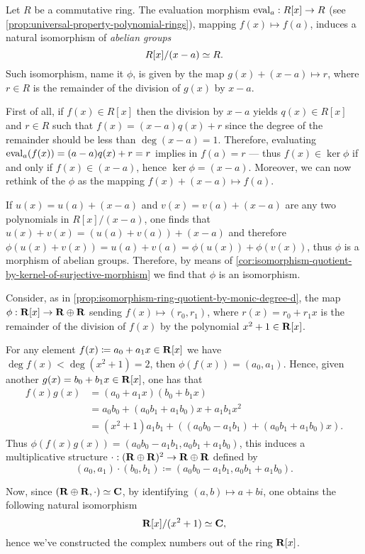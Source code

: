 \begin{example}[Evaluation]
\label{exp:evaluation-induces-isomorphism}
Let \(R\) be a commutative ring. The evaluation morphism \(\operatorname{eval}_a: R[x] \to R\)
(see \cref{prop:universal-property-polynomial-rings}), mapping
\(f(x) \mapsto f(a)\), induces a natural isomorphism of \emph{abelian groups}
\[
R[x]/(x - a) \simeq R.
\]
Such isomorphism, name it \(\phi\), is given by the map
\(g(x) + (x - a) \mapsto r\), where \(r \in R\) is the remainder of the division
of \(g(x)\) by \(x - a\).

First of all, if \(f(x) \in R[x]\) then the division by \(x - a\) yields
\(q(x) \in R[x]\) and \(r \in R\) such that \(f(x) = (x - a) q(x) + r\) since
the degree of the remainder should be less than \(\deg(x - a) = 1\). Therefore,
evaluating \(\operatorname{eval}_{a}(f(x)) = (a - a) q(x) + r = r\) implies in \(f(a) = r\)
--- thus \(f(x) \in \ker \phi\) if and only if \(f(x) \in (x - a)\), hence
\(\ker \phi = (x - a)\). Moreover, we can now rethink of the \(\phi\) as the
mapping \(f(x) + (x - a) \mapsto f(a)\).

If \(u(x) = u(a) + (x - a)\) and \(v(x) = v(a) + (x - a)\) are any two
polynomials in \(R[x]/(x - a)\), one finds that
\(u(x) + v(x) = (u(a) + v(a)) + (x - a)\) and therefore \(\phi(u(x) + v(x)) =
u(a) + v(a) = \phi(u(x)) + \phi(v(x))\), thus \(\phi\) is a morphism of abelian
groups. Therefore, by means of
\cref{cor:isomorphism-quotient-by-kernel-of-surjective-morphism} we find that
\(\phi\) is an isomorphism.
\end{example}

\begin{example}[Constructing \(\CC\)]
\label{exp:complex-numbers-from-R[x]}
Consider, as in \cref{prop:isomorphism-ring-quotient-by-monic-degree-d}, the map
\(\phi: \mathbf{R}[x] \to \mathbf{R} \oplus \mathbf{R}\) sending \(f(x) \mapsto (r_0, r_1)\), where
\(r(x) = r_0 + r_1 x\) is the remainder of the division of \(f(x)\) by the
polynomial \(x^2 + 1 \in \mathbf{R}[x]\).

For any element \(f(x) \coloneq a_0 + a_1 x \in \mathbf{R}[x]\) we have
\(\deg f(x) < \deg(x^2 + 1) = 2\), then \(\phi(f(x)) = (a_0, a_1)\). Hence,
given another \(g(x) = b_0 + b_1 x \in \mathbf{R}[x]\), one has that
\begin{align*}
  f(x) g(x)
  &= (a_0 + a_1 x) (b_0 + b_1 x) \\
  &= a_0 b_0 + (a_0 b_1 + a_1 b_0) x + a_1 b_1 x^2 \\
  &= (x^2 + 1) a_1 b_1 + ((a_0 b_0 - a_1 b_1) + (a_0 b_1 + a_1 b_0)x).
\end{align*}
Thus \(\phi(f(x) g(x)) = (a_0 b_0 - a_1 b_1, a_0 b_1 + a_1 b_0)\), this induces
a multiplicative structure \(\cdot: (\mathbf{R} \oplus \mathbf{R})^2 \to \mathbf{R} \oplus \mathbf{R}\) defined
by
\[
(a_0, a_1) \cdot (b_0, b_1) \coloneq (a_0 b_0 - a_1 b_1, a_0 b_1 + a_1 b_0).
\]

Now, since \((\mathbf{R} \oplus \mathbf{R}, \cdot) \simeq \mathbf{C}\), by identifying \((a, b) \mapsto a
+ b i\), one obtains the following natural isomorphism
\[
\mathbf{R}[x]/(x^2 + 1) \simeq \mathbf{C},
\]
hence we've constructed the complex numbers out of the ring \(\mathbf{R}[x]\).
\end{example}

